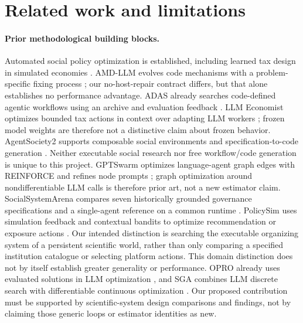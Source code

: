 \documentclass{article}
\begin{document}
\section{Related work and limitations}
\paragraph{Prior methodological building blocks.}
Automated social policy optimization is established, including learned tax
design in simulated economies \citep{zheng2020economist}. AMD-LLM evolves code
mechanisms with a problem-specific fixing process \citep{liu2025mechanism}; our
no-host-repair contract differs, but that alone establishes no performance
advantage. ADAS already searches code-defined agentic workflows using an archive
and evaluation feedback \citep{hu2024adas}. LLM Economist optimizes bounded tax
actions in context over adapting LLM workers \citep{karten2025economist}; frozen
model weights are therefore not a distinctive claim about frozen behavior.
AgentSociety2 supports composable social environments and specification-to-code
generation \citep{piao2026agentsociety2}. Neither executable social research nor
free workflow/code generation is unique to this project.
GPTSwarm optimizes language-agent graph edges with REINFORCE and refines
node prompts \citep{zhuge2024gptswarm}; graph optimization around
nondifferentiable LLM calls is therefore prior art, not a new estimator claim.
SocialSystemArena compares seven historically grounded governance
specifications and a single-agent reference on a common runtime
\citep{fei2026institutions}. PolicySim uses simulation feedback and contextual
bandits to optimize recommendation or exposure actions
\citep{huang2026policysim}. Our intended distinction is searching the executable
organizing system of a persistent scientific world, rather than only comparing
a specified institution catalogue or selecting platform actions. This domain
distinction does not by itself establish greater generality or performance.
OPRO already uses evaluated solutions in LLM optimization
\citep{yang2024opro}, and SGA combines LLM discrete search with differentiable
continuous optimization \citep{ma2024sga}. Our proposed contribution must be
supported by scientific-system design comparisons and findings, not by
claiming those generic loops or estimator identities as new.
\end{document}
